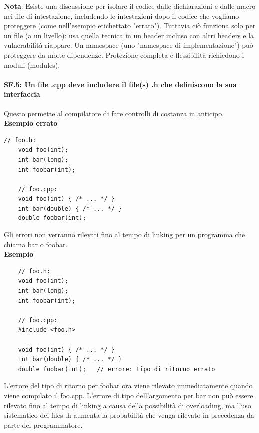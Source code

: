 \textsf{\small \textbf{Nota}: Esiste una discussione per isolare il codice dalle dichiarazioni e dalle macro nei file di intestazione, includendo le intestazioni dopo il codice che vogliamo proteggere (come nell'esempio etichettato "errato"). Tuttavia ciò funziona solo per un file (a un livello): usa quella tecnica in un header incluso con altri headers e la vulnerabilità riappare. Un namespace (uno "namespace di implementazione") può proteggere da molte dipendenze. Protezione completa e flessibilità richiedono i moduli (modules).} \\ %

\paragraph{SF.5: Un file .cpp deve includere il file(s) .h che definiscono la sua interfaccia}

\textsf{\small Questo permette al compilatore di fare controlli di costanza in anticipo.} \\

\textsf{\small \textbf{Esempio errato}}

\begin{lstlisting}[frame=single, rulecolor=\color{red}]
	// foo.h:
	void foo(int);
	int bar(long);
	int foobar(int);
	
	// foo.cpp:
	void foo(int) { /* ... */ }
	int bar(double) { /* ... */ }
	double foobar(int);
\end{lstlisting}

\textsf{\small Gli errori non verranno rilevati fino al tempo di linking per un programma che chiama bar o foobar.} \\

\textsf{\small \textbf{Esempio}}

\begin{lstlisting}
	// foo.h:
	void foo(int);
	int bar(long);
	int foobar(int);
	
	// foo.cpp:
	#include <foo.h>
	
	void foo(int) { /* ... */ }
	int bar(double) { /* ... */ }
	double foobar(int);   // errore: tipo di ritorno errato
\end{lstlisting}

\textsf{\small L'errore del tipo di ritorno per foobar ora viene rilevato immediatamente quando viene compilato il foo.cpp. L'errore di tipo dell'argomento per bar non può essere rilevato fino al tempo di linking a causa della possibilità di overloading, ma l'uso sistematico dei files .h aumenta la probabilità che venga rilevato in precedenza da parte del programmatore. } \\

